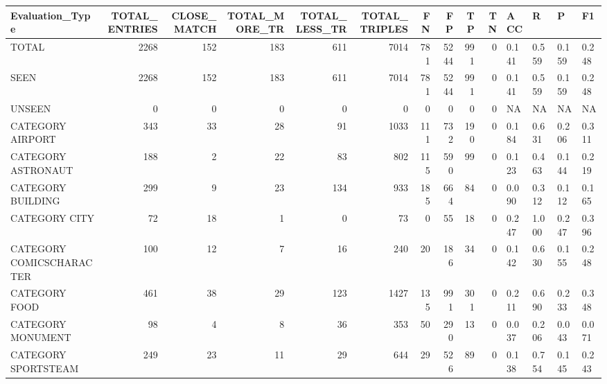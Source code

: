\begin{tabular}{lrrrrrrrrrllll}
\hline
 Evaluation\_Type          &   TOTAL\_ENTRIES &   CLOSE\_MATCH &   TOTAL\_MORE\_TR &   TOTAL\_LESS\_TR &   TOTAL\_TRIPLES &   FN &   FP &   TP &   TN & ACC   & R     & P     & F1    \\
\hline
 TOTAL                    &            2268 &           152 &             183 &             611 &            7014 &  781 & 5244 &  991 &    0 & 0.141 & 0.559 & 0.159 & 0.248 \\
 SEEN                     &            2268 &           152 &             183 &             611 &            7014 &  781 & 5244 &  991 &    0 & 0.141 & 0.559 & 0.159 & 0.248 \\
 UNSEEN                   &               0 &             0 &               0 &               0 &               0 &    0 &    0 &    0 &    0 & NA    & NA    & NA    & NA    \\
 CATEGORY AIRPORT         &             343 &            33 &              28 &              91 &            1033 &  111 &  732 &  190 &    0 & 0.184 & 0.631 & 0.206 & 0.311 \\
 CATEGORY ASTRONAUT       &             188 &             2 &              22 &              83 &             802 &  115 &  590 &   99 &    0 & 0.123 & 0.463 & 0.144 & 0.219 \\
 CATEGORY BUILDING        &             299 &             9 &              23 &             134 &             933 &  185 &  664 &   84 &    0 & 0.090 & 0.312 & 0.112 & 0.165 \\
 CATEGORY CITY            &              72 &            18 &               1 &               0 &              73 &    0 &   55 &   18 &    0 & 0.247 & 1.000 & 0.247 & 0.396 \\
 CATEGORY COMICSCHARACTER &             100 &            12 &               7 &              16 &             240 &   20 &  186 &   34 &    0 & 0.142 & 0.630 & 0.155 & 0.248 \\
 CATEGORY FOOD            &             461 &            38 &              29 &             123 &            1427 &  135 &  991 &  301 &    0 & 0.211 & 0.690 & 0.233 & 0.348 \\
 CATEGORY MONUMENT        &              98 &             4 &               8 &              36 &             353 &   50 &  290 &   13 &    0 & 0.037 & 0.206 & 0.043 & 0.071 \\
 CATEGORY SPORTSTEAM      &             249 &            23 &              11 &              29 &             644 &   29 &  526 &   89 &    0 & 0.138 & 0.754 & 0.145 & 0.243 \\

\end{tabular}
